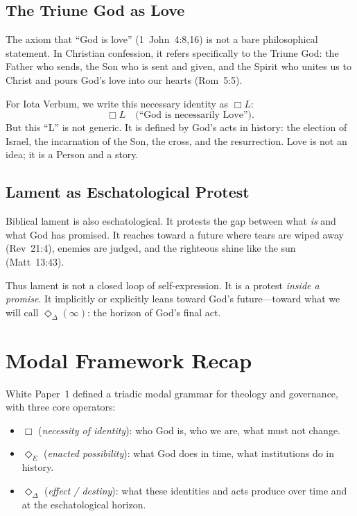 \documentclass[11pt]{article}
\begin{document}
\subsection{The Triune God as Love}

The axiom that ``God is love'' (1~John~4:8,16) is not a bare philosophical statement. In Christian confession, it refers specifically to the Triune God: the Father who sends, the Son who is sent and given, and the Spirit who unites us to Christ and pours God's love into our hearts (Rom~5:5).

For Iota Verbum, we write this necessary identity as $\Box L$:
\[
  \Box L \quad\text{(``God is necessarily Love'').}
\]
But this ``L'' is not generic. It is defined by God's acts in history: the election of Israel, the incarnation of the Son, the cross, and the resurrection. Love is not an idea; it is a Person and a story.

\subsection{Lament as Eschatological Protest}

Biblical lament is also eschatological. It protests the gap between what \emph{is} and what God has promised. It reaches toward a future where tears are wiped away (Rev~21:4), enemies are judged, and the righteous shine like the sun (Matt~13:43).

Thus lament is not a closed loop of self-expression. It is a protest \emph{inside a promise}. It implicitly or explicitly leans toward God's future---toward what we will call $\Diamond_{\Delta}(\infty)$: the horizon of God’s final act.

\section{Modal Framework Recap}

White Paper~1 defined a triadic modal grammar for theology and governance, with three core operators:
\begin{itemize}
  \item $\Box$ (\emph{necessity of identity}): who God is, who we are, what must not change.
  \item $\Diamond_E$ (\emph{enacted possibility}): what God does in time, what institutions do in history.
  \item $\Diamond_{\Delta}$ (\emph{effect / destiny}): what these identities and acts produce over time and at the eschatological horizon.
\end{itemize}
\end{document}
